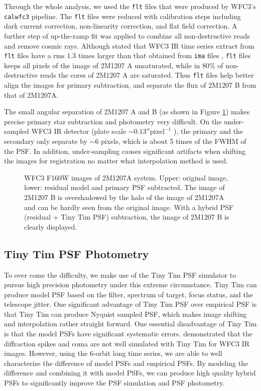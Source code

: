 \documentclass[apj]{emulateapj}
\newcommand{\ima}{\texttt{ima} files }
\newcommand{\flt}{\texttt{flt} files }
\begin{document}
Through the whole analysis, we used the \flt that were
produced by WFC3's \texttt{calwfc3} pipeline. The \flt were reduced
with calibration steps including dark current correction, non-linearity
correction, and flat field correction. A further step of up-the-ramp
fit was applied to combine all non-destructive reads and remove cosmic
rays. Although \cite{Mandell2013} stated that WFC3 IR time series
extract from {\flt} have a rms 1.3 times larger than that obtained
from {\ima}, \flt keeps all pixels of the image of 2M1207 A
unsaturated, while in 80\% of non-destructive reads the cores of 2M1207
A are saturated. Thus \flt help better align the images for primary
subtraction, and separate the flux of 2M1207 B from that of 2M1207A. 

The small angular separation of 2M1207 A and B (as shown in Figure
\ref{fig:1}) makes precise primary star subtraction and photometry
very difficult. On the under-sampled WFC3 IR detector (plate scale
$\sim 0.13''\mbox{pixel}^{-1}$ \cite{dressel2012wide}), the primary
and the secondary only separate by $\sim 6$ pixels, which is about 5
times of the FWHM of the PSF. In addition, under-sampling causes
significant artifacts when shifting the images for registration no
matter what interpolation method is used.

\begin{figure}
  \centering
  \caption{WFC3 F160W images of 2M1207A system. Upper: original image,
    lower: residual model and primary PSF subtracted. The image of
    2M1207 B is overshadowed by the halo of the image of 2M1207A and
    can be hardly seen from the original image. With a hybrid PSF
    (residual + Tiny Tim PSF) subtraction, the image of 2M1207 B is
    clearly displayed.}
  \label{fig:1}
\end{figure}

\subsection{Tiny Tim PSF Photometry}
To over come the difficulty, we make use of the Tiny Tim PSF simulator
to pursue high precision photometry under this extreme
circumstance. Tiny Tim can produce model PSF based on the filter,
spectrum of target, focus status, and the telescope jitter. One
significant advantage of Tiny Tim PSF over empirical PSF is that Tiny Tim can
produce Nyquist sampled PSF, which makes image shifting and interpolation
rather straight forward. One essential disadvantage of Tiny Tim is
that the model PSFs have significant systematic
errors. \cite{Biretta2014} demonstrated that the diffraction
spikes and coma are not well simulated with Tiny Tim for WFC3 IR
images. However, using the 6-orbit long time series, we are able
to well characterize the difference of model PSFs and empirical PSFs.
By modeling the difference and combining it with model PSFs, we can
produce high quality hybrid PSFs to significantly improve the PSF
simulation and PSF photometry.
\end{document}
